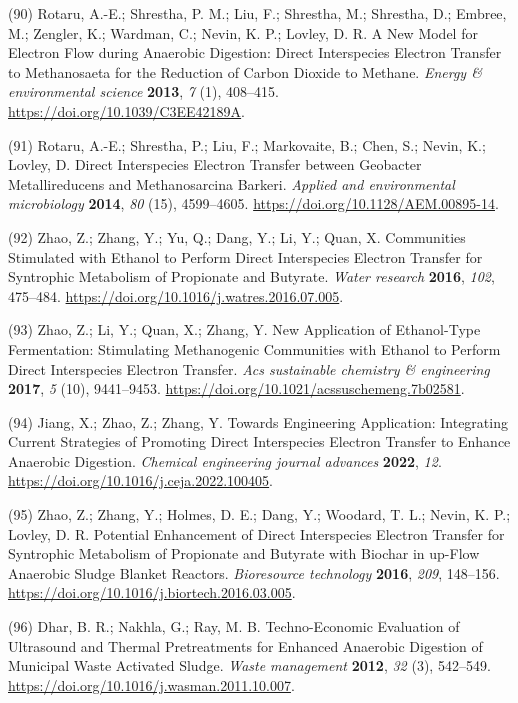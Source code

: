 \documentclass[11pt]{report}
\begin{document}
\hypertarget{citeproc_bib_item_90}{(90) Rotaru, A.-E.; Shrestha, P. M.; Liu, F.; Shrestha, M.; Shrestha, D.; Embree, M.; Zengler, K.; Wardman, C.; Nevin, K. P.; Lovley, D. R. A New Model for Electron Flow during Anaerobic Digestion: Direct Interspecies Electron Transfer to Methanosaeta for the Reduction of Carbon Dioxide to Methane. \textit{Energy \& environmental science} \textbf{2013}, \textit{7} (1), 408–415. \url{https://doi.org/10.1039/C3EE42189A}.}

\hypertarget{citeproc_bib_item_91}{(91) Rotaru, A.-E.; Shrestha, P.; Liu, F.; Markovaite, B.; Chen, S.; Nevin, K.; Lovley, D. Direct Interspecies Electron Transfer between Geobacter Metallireducens and Methanosarcina Barkeri. \textit{Applied and environmental microbiology} \textbf{2014}, \textit{80} (15), 4599–4605. \url{https://doi.org/10.1128/AEM.00895-14}.}

\hypertarget{citeproc_bib_item_92}{(92) Zhao, Z.; Zhang, Y.; Yu, Q.; Dang, Y.; Li, Y.; Quan, X. Communities Stimulated with Ethanol to Perform Direct Interspecies Electron Transfer for Syntrophic Metabolism of Propionate and Butyrate. \textit{Water research} \textbf{2016}, \textit{102}, 475–484. \url{https://doi.org/10.1016/j.watres.2016.07.005}.}

\hypertarget{citeproc_bib_item_93}{(93) Zhao, Z.; Li, Y.; Quan, X.; Zhang, Y. New Application of Ethanol-Type Fermentation: Stimulating Methanogenic Communities with Ethanol to Perform Direct Interspecies Electron Transfer. \textit{Acs sustainable chemistry \& engineering} \textbf{2017}, \textit{5} (10), 9441–9453. \url{https://doi.org/10.1021/acssuschemeng.7b02581}.}

\hypertarget{citeproc_bib_item_94}{(94) Jiang, X.; Zhao, Z.; Zhang, Y. Towards Engineering Application: Integrating Current Strategies of Promoting Direct Interspecies Electron Transfer to Enhance Anaerobic Digestion. \textit{Chemical engineering journal advances} \textbf{2022}, \textit{12}. \url{https://doi.org/10.1016/j.ceja.2022.100405}.}

\hypertarget{citeproc_bib_item_95}{(95) Zhao, Z.; Zhang, Y.; Holmes, D. E.; Dang, Y.; Woodard, T. L.; Nevin, K. P.; Lovley, D. R. Potential Enhancement of Direct Interspecies Electron Transfer for Syntrophic Metabolism of Propionate and Butyrate with Biochar in up-Flow Anaerobic Sludge Blanket Reactors. \textit{Bioresource technology} \textbf{2016}, \textit{209}, 148–156. \url{https://doi.org/10.1016/j.biortech.2016.03.005}.}

\hypertarget{citeproc_bib_item_96}{(96) Dhar, B. R.; Nakhla, G.; Ray, M. B. Techno-Economic Evaluation of Ultrasound and Thermal Pretreatments for Enhanced Anaerobic Digestion of Municipal Waste Activated Sludge. \textit{Waste management} \textbf{2012}, \textit{32} (3), 542–549. \url{https://doi.org/10.1016/j.wasman.2011.10.007}.}
\end{document}

